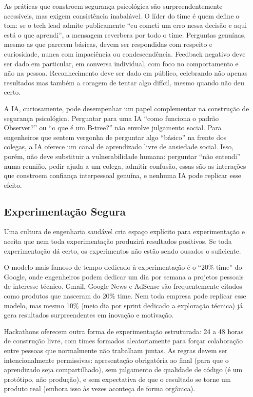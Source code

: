 As práticas que constroem segurança psicológica são surpreendentemente
acessíveis, mas exigem consistência inabalável. O líder do time é quem
define o tom: se o tech lead admite publicamente ``eu cometi um erro nessa
decisão e aqui está o que aprendi'', a mensagem reverbera por todo o time.
Perguntas genuínas, mesmo as que parecem básicas, devem ser respondidas
com respeito e curiosidade, nunca com impaciência ou condescendência.
Feedback negativo deve ser dado em particular, em conversa individual, com
foco no comportamento e não na pessoa. Reconhecimento deve ser dado em
público, celebrando não apenas resultados mas também a coragem de tentar
algo difícil, mesmo quando não deu certo.

A IA, curiosamente, pode desempenhar um papel complementar na construção de
segurança psicológica. Perguntar para uma IA ``como funciona o padrão Observer?''
ou ``o que é um B-tree?'' não envolve julgamento social. Para engenheiros que
sentem vergonha de perguntar algo ``básico'' na frente dos colegas, a IA
oferece um canal de aprendizado livre de ansiedade social. Isso, porém, não
deve substituir a vulnerabilidade humana: perguntar ``não entendi'' numa reunião,
pedir ajuda a um colega, admitir confusão, essas são as interações que
constroem confiança interpessoal genuína, e nenhuma IA pode replicar esse efeito.

\subsection{Experimentação Segura}

Uma cultura de engenharia saudável cria espaço explícito para experimentação
e aceita que nem toda experimentação produzirá resultados positivos. Se
toda experimentação dá certo, os experimentos não estão sendo ousados o
suficiente.

O modelo mais famoso de tempo dedicado à experimentação é o ``20\% time'' do
Google, onde engenheiros podem dedicar um dia por semana a projetos pessoais
de interesse técnico. Gmail, Google News e AdSense são frequentemente citados
como produtos que nasceram do 20\% time. Nem toda empresa pode replicar esse
modelo, mas mesmo 10\% (meio dia por sprint dedicado a exploração técnica)
já gera resultados surpreendentes em inovação e motivação.

Hackathons oferecem outra forma de experimentação estruturada: 24 a 48 horas
de construção livre, com times formados aleatoriamente para forçar
colaboração entre pessoas que normalmente não trabalham juntas. As regras
devem ser intencionalmente permissivas: apresentação obrigatória ao final
(para que o aprendizado seja compartilhado), sem julgamento de qualidade de
código (é um protótipo, não produção), e sem expectativa de que o resultado
se torne um produto real (embora isso às vezes aconteça de forma orgânica).

